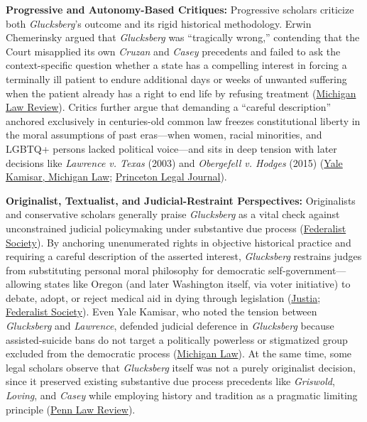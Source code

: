\documentclass[12pt]{article}
\begin{document}
\textbf{Progressive and Autonomy-Based Critiques:} Progressive scholars criticize both \textit{Glucksberg}'s outcome and its rigid historical methodology. Erwin Chemerinsky argued that \textit{Glucksberg} was ``tragically wrong,'' contending that the Court misapplied its own \textit{Cruzan} and \textit{Casey} precedents and failed to ask the context-specific question whether a state has a compelling interest in forcing a terminally ill patient to endure additional days or weeks of unwanted suffering when the patient already has a right to end life by refusing treatment (\href{https://repository.law.umich.edu/mlr/vol106/iss8/2/}{Michigan Law Review}). Critics further argue that demanding a ``careful description'' anchored exclusively in centuries-old common law freezes constitutional liberty in the moral assumptions of past eras---when women, racial minorities, and LGBTQ+ persons lacked political voice---and sits in deep tension with later decisions like \textit{Lawrence v. Texas} (2003) and \textit{Obergefell v. Hodges} (2015) (\href{https://repository.law.umich.edu/facarticles/259/}{Yale Kamisar, Michigan Law}; \href{https://legaljournal.princeton.edu/the-right-to-death-how-an-examination-of-washington-v-glucksberg-reveals-the-future-of-fundamental-rights/}{Princeton Legal Journal}).

\textbf{Originalist, Textualist, and Judicial-Restraint Perspectives:} Originalists and conservative scholars generally praise \textit{Glucksberg} as a vital check against unconstrained judicial policymaking under substantive due process (\href{https://fedsoc.org/case/washington-v-glucksberg}{Federalist Society}). By anchoring unenumerated rights in objective historical practice and requiring a careful description of the asserted interest, \textit{Glucksberg} restrains judges from substituting personal moral philosophy for democratic self-government---allowing states like Oregon (and later Washington itself, via voter initiative) to debate, adopt, or reject medical aid in dying through legislation (\href{https://supreme.justia.com/cases/federal/us/521/702/}{Justia}; \href{https://fedsoc.org/case/washington-v-glucksberg}{Federalist Society}). Even Yale Kamisar, who noted the tension between \textit{Glucksberg} and \textit{Lawrence}, defended judicial deference in \textit{Glucksberg} because assisted-suicide bans do not target a politically powerless or stigmatized group excluded from the democratic process (\href{https://repository.law.umich.edu/facarticles/259/}{Michigan Law}). At the same time, some legal scholars observe that \textit{Glucksberg} itself was not a purely originalist decision, since it preserved existing substantive due process precedents like \textit{Griswold}, \textit{Loving}, and \textit{Casey} while employing history and tradition as a pragmatic limiting principle (\href{https://pennlawreview.com/2025/06/10/kavanaugh-rahimi-and-the-effort-to-legitimate-originalism/}{Penn Law Review}).
\end{document}
